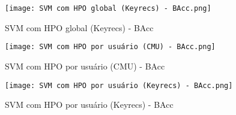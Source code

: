 \begin{figure}[H]
    \caption{SVM com HPO global (Keyrecs) - BAcc}\label{fig:SVM com HPO global (Keyrecs) - BAcc}
    \centering
    \texttt{[image: SVM com HPO global (Keyrecs) - BAcc.png]}
\end{figure}
\begin{figure}[H]
    \caption{SVM com HPO por usuário (CMU) - BAcc}\label{fig:SVM com HPO por usuário (CMU) - BAcc}
    \centering
    \texttt{[image: SVM com HPO por usuário (CMU) - BAcc.png]}
\end{figure}
\begin{figure}[H]
    \caption{SVM com HPO por usuário (Keyrecs) - BAcc}\label{fig:SVM com HPO por usuário (Keyrecs) - BAcc}
    \centering
    \texttt{[image: SVM com HPO por usuário (Keyrecs) - BAcc.png]}
\end{figure}